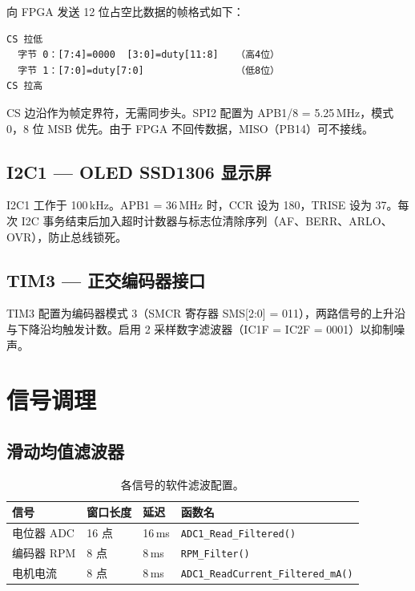 \documentclass[12pt, a4paper]{ctexrep}
\begin{document}
向 FPGA 发送 12 位占空比数据的帧格式如下：

\begin{verbatim}
CS 拉低
  字节 0：[7:4]=0000  [3:0]=duty[11:8]   （高4位）
  字节 1：[7:0]=duty[7:0]                （低8位）
CS 拉高
\end{verbatim}

CS 边沿作为帧定界符，无需同步头。SPI2 配置为 APB1/8 = 5.25\,MHz，模式 0，8 位 MSB 优先。由于 FPGA 不回传数据，MISO（PB14）可不接线。

\subsection{I2C1 — OLED SSD1306 显示屏}

I2C1 工作于 100\,kHz。APB1 = 36\,MHz 时，CCR 设为 180，TRISE 设为 37。每次 I2C 事务结束后加入超时计数器与标志位清除序列（AF、BERR、ARLO、OVR），防止总线锁死。

\subsection{TIM3 — 正交编码器接口}

TIM3 配置为编码器模式 3（SMCR 寄存器 SMS[2:0] = 011），两路信号的上升沿与下降沿均触发计数。启用 2 采样数字滤波器（IC1F = IC2F = 0001）以抑制噪声。

\section{信号调理}

\subsection{滑动均值滤波器}

\begin{table}[H]
    \centering
    \caption{各信号的软件滤波配置。}
    \label{tab:filters}
    \begin{tabular}{llll}
        \toprule
        \textbf{信号} & \textbf{窗口长度} & \textbf{延迟} & \textbf{函数名} \\
        \midrule
        电位器 ADC & 16 点 & 16\,ms & \texttt{ADC1\_Read\_Filtered()} \\
        编码器 RPM & 8 点  & 8\,ms  & \texttt{RPM\_Filter()} \\
        电机电流   & 8 点  & 8\,ms  & \texttt{ADC1\_ReadCurrent\_Filtered\_mA()} \\
        \bottomrule
    \end{tabular}
\end{table}
\end{document}
